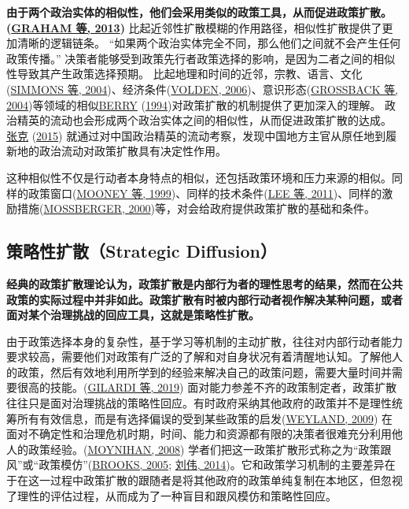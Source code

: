 \documentclass[
  12pt,
]{ctexart}
\begin{document}
\textbf{由于两个政治实体的相似性，他们会采用类似的政策工具，从而促进政策扩散。(\protect\hyperlink{ref-GrahamEtAl2013}{GRAHAM 等, 2013})}
比起近邻性扩散模糊的作用路径，相似性扩散提供了更加清晰的逻辑链条。
``如果两个政治实体完全不同，那么他们之间就不会产生任何政策传播。''
决策者能够受到政策先行者政策选择的影响，是因为二者之间的相似性导致其产生政策选择预期。
比起地理和时间的近邻，宗教、语言、文化(\protect\hyperlink{ref-SimmonsElkins2004}{SIMMONS 等, 2004})、经济条件(\protect\hyperlink{ref-Volden2006}{VOLDEN, 2006})、意识形态(\protect\hyperlink{ref-GrossbackEtAl2004a}{GROSSBACK 等, 2004})等领域的相似\protect\hyperlink{ref-Berry1994}{BERRY} (\protect\hyperlink{ref-Berry1994}{1994})对政策扩散的机制提供了更加深入的理解。
政治精英的流动也会形成两个政治实体之间的相似性，从而促进政策扩散的达成。
\protect\hyperlink{ref-ZhangKe2015}{张克} (\protect\hyperlink{ref-ZhangKe2015}{2015}) 就通过对中国政治精英的流动考察，发现中国地方主官从原任地到履新地的政治流动对政策扩散具有决定性作用。

这种相似性不仅是行动者本身特点的相似，还包括政策环境和压力来源的相似。同样的政策窗口(\protect\hyperlink{ref-MooneyLee1999}{MOONEY 等, 1999})、同样的技术条件(\protect\hyperlink{ref-LeeEtAl2011}{LEE 等, 2011})、同样的激励措施(\protect\hyperlink{ref-Mossberger2000}{MOSSBERGER, 2000})等，对会给政府提供政策扩散的基础和条件。

\hypertarget{ux7b56ux7565ux6027ux6269ux6563strategic-diffusion}{%
\subsection{策略性扩散（Strategic Diffusion）}\label{ux7b56ux7565ux6027ux6269ux6563strategic-diffusion}}

\textbf{经典的政策扩散理论认为，政策扩散是内部行为者的理性思考的结果，然而在公共政策的实际过程中并非如此。政策扩散有时被内部行动者视作解决某种问题，或者面对某个治理挑战的回应工具，这就是策略性扩散。}

由于政策选择本身的复杂性，基于学习等机制的主动扩散，往往对内部行动者能力要求较高，需要他们对政策有广泛的了解和对自身状况有着清醒地认知。了解他人的政策，然后有效地利用所学到的经验来解决自己的政策问题，需要大量时间并需要很高的技能。(\protect\hyperlink{ref-GilardiWasserfallen2019}{GILARDI 等, 2019})
面对能力参差不齐的政策制定者，政策扩散往往只是面对治理挑战的策略性回应。有时政府采纳其他政府的政策并不是理性统筹所有有效信息，而是有选择偏误的受到某些政策的启发(\protect\hyperlink{ref-Weyland2009}{WEYLAND, 2009}) 在面对不确定性和治理危机时期，时间、能力和资源都有限的决策者很难充分利用他人的政策经验。(\protect\hyperlink{ref-Moynihan2008}{MOYNIHAN, 2008}) 学者们把这一政策扩散形式称之为``政策跟风''或``政策模仿''(\protect\hyperlink{ref-Brooks2005}{BROOKS, 2005}; \protect\hyperlink{ref-LiuWei2014}{刘伟, 2014})。它和政策学习机制的主要差异在于在这一过程中政策扩散的跟随者是将其他政府的政策单纯复制在本地区，但忽视了理性的评估过程，从而成为了一种盲目和跟风模仿和策略性回应。
\end{document}
